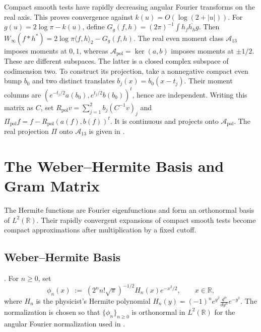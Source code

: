 \begin{remark}
\label{v4-arith:w7-h:rem:domain}
Compact smooth tests have rapidly decreasing angular Fourier transforms
on the real axis. This proves convergence against $k(u)=O(\log(2+|u|))$.
For $g(u)=2\log\pi-k(u)$, define
$G_g(f,h)=(2\pi)^{-1}\int h_f\overline{h_h}g$.
Then $W_\infty(f*h^*)=2\log\pi\langle f,h\rangle_2-G_g(f,h)$.
The real even moment class $\mathscr A_{13}$ imposes moments
at $0,1$, whereas $\mathscr A_{\mathrm{pol}}=\ker(a,b)$ imposes
moments at $\pm1/2$. These are different subspaces.
The latter is a closed complex subspace of codimension two.
To construct its projection, take a nonnegative compact even bump $b_0$
and two distinct translates $b_j(x)=b_0(x-t_j)$.
Their moment columns are
$(e^{-t_j/2}a(b_0),e^{t_j/2}b(b_0))^t$, hence are independent.
Writing this matrix as $C$, set
$R_{\mathrm{pol}}v=\sum_{j=1}^2b_j(C^{-1}v)_j$ and
$\Pi_{\mathrm{pol}}f=f-R_{\mathrm{pol}}(a(f),b(f))^t$.
It is continuous and projects onto $\mathscr A_{\mathrm{pol}}$.
The real projection $\Pi$ onto $\mathscr A_{13}$ is given in
.
\end{remark}

\section{The Weber--Hermite Basis and Gram Matrix}
\label{v4-arith:w7-h:hermite-basis}

The Hermite functions are Fourier eigenfunctions and form an orthonormal
basis of $L^2(\mathbb R)$. Their rapidly convergent expansions of
compact smooth tests become compact approximations after multiplication
by a fixed cutoff.

\subsection{Weber--Hermite Basis}
\label{v4-arith:w7-h:hermite-basis:def}

\begin{definition}
\label{v4-arith:w7-h:def:hermite}
\ClaimStatusDefinitional. For \(n\geq 0\), set
\begin{equation}
\label{v4-arith:w7-h:eq:hermite}
\phi_{n}(x)\;:=\;(2^{n}n!\sqrt{\pi})^{-1/2}H_{n}(x)e^{-x^{2}/2},
\qquad x\in\mathbb{R},
\end{equation}
where \(H_{n}\) is the physicist's Hermite polynomial
\(H_{n}(y)=(-1)^{n}e^{y^{2}}\frac{d^{n}}{dy^{n}}e^{-y^{2}}\).
The normalization is chosen so that \(\{\phi_{n}\}_{n\geq 0}\) is
orthonormal in \(L^{2}(\mathbb{R})\) for the angular Fourier
normalization used in .
\end{definition}

